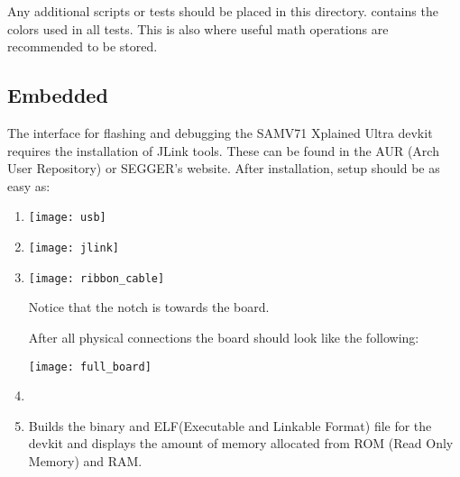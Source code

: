 \documentclass[12pt, a4paper]{article}
\begin{document}
\medskip
\noindent
Any additional scripts or tests should be placed in this directory. 
  contains the colors used in all tests. 
This is also where useful math operations are recommended to be stored. 

\newpage
\subsection{Embedded}
The interface for flashing and debugging the SAMV71 Xplained Ultra devkit requires the installation of JLink tools. 
These can be found in the AUR (Arch User Repository) or SEGGER's website.
After installation, setup should be as easy as:

\begin{enumerate}

    \item {}

        \begin{centering}
        \texttt{[image: usb]}
        \end{centering}

    \item {}

        \begin{centering}
        \texttt{[image: jlink]}
        \end{centering}

    \item {}

        \begin{centering}
        \texttt{[image: ribbon\_cable]}
        \end{centering}

        Notice that the notch is towards the board.

        \noindent
        After all physical connections the board should look like the following:

        \begin{centering}
        \texttt{[image: full\_board]}
        \end{centering}

    \newpage
    \item {}
    \item {}

        \medskip
        \noindent
        Builds the binary and ELF(Executable and Linkable Format) file for the devkit and displays the amount of memory allocated from ROM (Read Only Memory) and RAM.
        

\end{enumerate}
\end{document}
